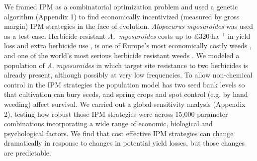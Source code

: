 \documentclass[9pt,twocolumn,twoside,lineno]{pnas-new}
\begin{document}
We framed IPM as a combinatorial optimization problem and used a genetic algorithm (Appendix 1) to find economically incentivized (measured by gross margin) IPM strategies \citep{Tayl2004GA, Carr2010} in the face of evolution. \textit{Alopecurus myosuroides} was used as a test case. Herbicide-resistant \textit{A.\ myosuroides} costs up to \pounds 320$\cdot$ha$^{-1}$ in yield loss and extra herbicide use \citep{Hick2018}, is one of Europe's most economically costly weeds \citep{Moss2007}, and one of the world's most serious herbicide resistant weeds \citep{Heap2014}. We modeled a population of \textit{A. myosuroides} in which target site resistance to two herbicides is already present, although possibly at very low frequencies. To allow non-chemical control in the IPM strategies the population model has two seed bank levels so that cultivation can bury seeds, and spring crops and spot control (e.g. by hand weeding) affect survival. We carried out a global sensitivity analysis (Appendix 2), testing how robust those IPM strategies were across 15,000 parameter combinations incorporating a wide range of economic, biological and psychological factors. We find that cost effective IPM strategies can change dramatically in response to changes in potential yield losses, but those changes are predictable. 
\end{document}
